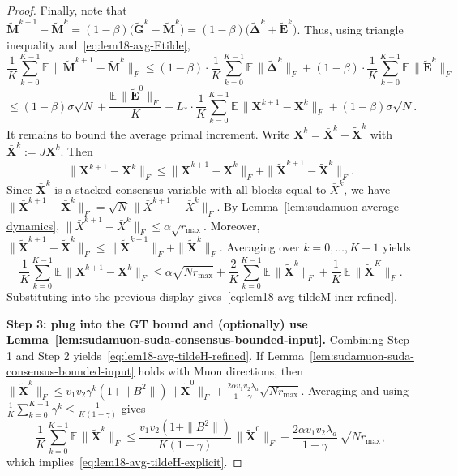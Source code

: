 \documentclass{article}
\begin{document}
\begin{proof}
Finally, note that
$\tilde{\mathbf M}^{k+1}-\tilde{\mathbf M}^{k}=(1-\beta)\big(\tilde{\mathbf G}^k-\tilde{\mathbf M}^k\big)=(1-\beta)\big(\tilde{\mathbf\Delta}^k+\tilde{\mathbf E}^k\big)$.
Thus, using triangle inequality and~\eqref{eq:lem18-avg-Etilde},
\[
\frac{1}{K}\sum_{k=0}^{K-1}\mathbb{E}\,\|\tilde{\mathbf M}^{k+1}-\tilde{\mathbf M}^{k}\|_F
\le (1-\beta)\cdot\frac{1}{K}\sum_{k=0}^{K-1}\mathbb{E}\,\|\tilde{\mathbf\Delta}^k\|_F
+(1-\beta)\cdot\frac{1}{K}\sum_{k=0}^{K-1}\mathbb{E}\,\|\tilde{\mathbf E}^k\|_F
\]
\[
\le (1-\beta)\sigma\sqrt N
+\frac{\mathbb{E}\,\|\tilde{\mathbf E}^{0}\|_F}{K}
+L_*\cdot\frac{1}{K}\sum_{k=0}^{K-1}\mathbb{E}\,\|\mathbf X^{k+1}-\mathbf X^k\|_F
+(1-\beta)\sigma\sqrt N.
\]
It remains to bound the average primal increment.
Write $\mathbf X^k=\bar{\mathbf X}^k+\tilde{\mathbf X}^k$ with $\bar{\mathbf X}^k:=J\mathbf X^k$.
Then
\[
\|\mathbf X^{k+1}-\mathbf X^{k}\|_F
\le \|\bar{\mathbf X}^{k+1}-\bar{\mathbf X}^{k}\|_F+\|\tilde{\mathbf X}^{k+1}-\tilde{\mathbf X}^{k}\|_F.
\]
Since $\bar{\mathbf X}^k$ is a stacked consensus variable with all blocks equal to $\bar X^k$, we have
$\|\bar{\mathbf X}^{k+1}-\bar{\mathbf X}^{k}\|_F=\sqrt N\,\|\bar X^{k+1}-\bar X^{k}\|_F$.
By Lemma~\ref{lem:sudamuon-average-dynamics}, $\|\bar X^{k+1}-\bar X^{k}\|_F\le \alpha\sqrt{r_{\max}}$.
Moreover, $\|\tilde{\mathbf X}^{k+1}-\tilde{\mathbf X}^{k}\|_F\le \|\tilde{\mathbf X}^{k+1}\|_F+\|\tilde{\mathbf X}^{k}\|_F$.
Averaging over $k=0,\dots,K-1$ yields
\[
\frac{1}{K}\sum_{k=0}^{K-1}\mathbb{E}\,\|\mathbf X^{k+1}-\mathbf X^{k}\|_F
\le \alpha\sqrt{Nr_{\max}}+\frac{2}{K}\sum_{k=0}^{K-1}\mathbb{E}\,\|\tilde{\mathbf X}^{k}\|_F+\frac{1}{K}\,\mathbb{E}\,\|\tilde{\mathbf X}^{K}\|_F.
\]
Substituting into the previous display gives~\eqref{eq:lem18-avg-tildeM-incr-refined}.

\medskip\noindent\textbf{Step 3: plug into the GT bound and (optionally) use Lemma~\ref{lem:sudamuon-suda-consensus-bounded-input}.}
Combining Step 1 and Step 2 yields~\eqref{eq:lem18-avg-tildeH-refined}.
If Lemma~\ref{lem:sudamuon-suda-consensus-bounded-input} holds with Muon directions, then
$\|\tilde{\mathbf X}^k\|_F\le v_1v_2\gamma^k(1+\|B^2\|)\|\tilde{\mathbf X}^0\|_F+\frac{2\alpha v_1v_2\lambda_a}{1-\gamma}\sqrt{Nr_{\max}}$.
Averaging and using $\frac1K\sum_{k=0}^{K-1}\gamma^k\le \frac{1}{K(1-\gamma)}$ gives
\[
\frac{1}{K}\sum_{k=0}^{K-1}\mathbb{E}\,\|\tilde{\mathbf X}^{k}\|_F
\le \frac{v_1v_2(1+\|B^2\|)}{K(1-\gamma)}\,\|\tilde{\mathbf X}^{0}\|_F
+\frac{2\alpha v_1v_2\lambda_a}{1-\gamma}\,\sqrt{Nr_{\max}},
\]
which implies~\eqref{eq:lem18-avg-tildeH-explicit}.
\end{proof}
\end{document}
